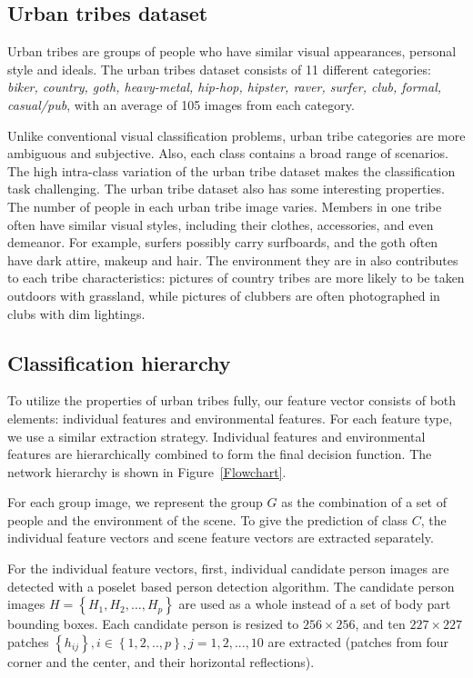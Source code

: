 \documentclass[10pt,twocolumn,letterpaper]{article}
\begin{document}
\subsection{Urban tribes dataset}
Urban tribes are groups of people who have similar visual appearances, personal style and ideals. The urban tribes dataset consists of 11 different categories: \emph{biker, country, goth, heavy-metal, hip-hop, hipster, raver, surfer, club, formal, casual/pub}, with an average of 105 images from each category. 

Unlike conventional visual classification problems, urban tribe categories are more ambiguous and subjective. Also, each class contains a broad range of scenarios. The high intra-class variation of the urban tribe dataset makes the classification task challenging. The urban tribe dataset also has some interesting properties. The number of people in each urban tribe image varies. Members in one tribe often have similar visual styles, including their clothes, accessories, and even demeanor. For example, surfers possibly carry surfboards, and the goth often have dark attire, makeup and hair. The environment they are in also contributes to each tribe characteristics: pictures of country tribes are more likely to be taken outdoors with grassland, while pictures of clubbers are often photographed in clubs with dim lightings. 

\subsection{Classification hierarchy}

To utilize the properties of urban tribes fully, our feature vector consists of both elements: individual features and environmental features. For each feature type, we use a similar extraction strategy. Individual features and environmental features are hierarchically combined to form the final decision function. The network hierarchy is shown in Figure~\ref{Flowchart}. 

For each group image, we represent the group $G$ as the combination of a set of people and the environment of the scene. To give the prediction of class $C$, the individual feature vectors and scene feature vectors are extracted separately.
 
For the individual feature vectors, first, individual candidate person images are detected with a poselet based person detection algorithm. The candidate person images $H = \left\{H_{1}, H_{2}, ..., H_{p} \right\}$ are used as a whole instead of a set of body part bounding boxes. Each candidate person is resized to $256 \times 256$, and ten $227 \times 227$ patches $\left\{h_{ij}\right\}, i \in \left\{1,2,..,p\right\}, j=1,2,...,10$ are extracted (patches from four corner and the center, and their horizontal reflections).
\end{document}
